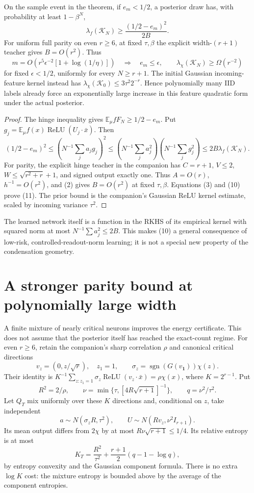 \documentclass[11pt]{article}
\newcommand{\E}{\mathbb E}\newcommand{\R}{\mathbb R}
\newcommand{\relu}{\operatorname{ReLU}}\newcommand{\Prb}{\mathbb P}
\begin{document}
\begin{corollary}
On the sample event in the theorem, if $e_m<1/2$, a posterior draw has,
with probability at least $1-\beta^N$,
\[
 \lambda_f(\mathcal K_N)\ge\frac{(1/2-e_m)^2}{2B}.        \tag{10}
\]
For uniform full parity on even $r\ge6$, at fixed $\tau,\beta$ the
explicit width-$(r+1)$ teacher gives $B=O(r^2)$. Thus
\[
 m=O\!\left(r^5\epsilon^{-2}[1+\log(1/\eta)]\right)
 \quad\Longrightarrow\quad e_m\le\epsilon,
 \qquad \lambda_\chi(\mathcal K_N)\ge\Omega(r^{-2})       \tag{11}
\]
for fixed $\epsilon<1/2$, uniformly for every $N\ge r+1$.
The initial Gaussian incoming-feature kernel instead has
$\lambda_\chi(\mathcal K_0)\le3\tau^2 2^{-r}$.
Hence polynomially many IID labels already force an exponentially large
increase in this feature quadratic form under the actual posterior.
\end{corollary}
\begin{proof}
The hinge inequality gives $\E_\mu fF_N\ge1/2-e_m$.
Put $g_j=\E_\mu f(x)\relu(U_j\cdot\bar x)$. Then
\[
 (1/2-e_m)^2\le\left(N^{-1}\sum_j a_jg_j\right)^2
 \le\left(N^{-1}\sum_j a_j^2\right)
                         \left(N^{-1}\sum_jg_j^2\right)
 \le2B\lambda_f(\mathcal K_N).
\]
For parity, the explicit hinge teacher in the companion has
$C=r+1$, $V\le2$, $W\le\sqrt{r^2+r}+1$, and signed output exactly one.
Thus $A=O(r)$, $h^{-1}=O(r^2)$, and (2) gives $B=O(r^2)$ at fixed
$\tau,\beta$. Equations (3) and (10) prove (11).
The prior bound is the companion's Gaussian ReLU kernel estimate,
scaled by incoming variance $\tau^2$.
\end{proof}
The learned network itself is a function in the RKHS of its empirical
kernel with squared norm at most $N^{-1}\sum a_j^2\le2B$. This makes
(10) a general consequence of low-risk, controlled-readout-norm learning;
it is not a special new property of the condensation geometry.

\section{A stronger parity bound at polynomially large width}
A finite mixture of nearly critical neurons improves the energy certificate.
This does not assume that the posterior itself has reached the exact-count
regime. For even $r\ge6$, retain the companion's sharp correlation $\rho$
and canonical critical directions
\[
 v_z=(0,z/\sqrt r),\quad z_1=1,\qquad
 \sigma_z=\operatorname{sgn}(G(v_{\boldsymbol1}))\chi(z).
\]
Their identity is
$K^{-1}\sum_{z:z_1=1}\sigma_z\relu(v_z\cdot\bar x)=\rho\chi(x)$,
where $K=2^{r-1}$. Put
\[
 R^2=2/\rho,\qquad
 \nu=\min\{\tau,[4R\sqrt{r+1}]^{-1}\},\qquad q=\nu^2/\tau^2.
\]
Let $Q_T$ mix uniformly over these $K$ directions and, conditional on $z$,
take independent
\[
 a\sim N(\sigma_zR,\tau^2),\qquad
 U\sim N(Rv_z,\nu^2I_{r+1}).
\]
Its mean output differs from $2\chi$ by at most
$R\nu\sqrt{r+1}\le1/4$. Its relative entropy is at most
\[
 K_T=\frac{R^2}{\tau^2}
             +\frac{r+1}{2}(q-1-\log q),                 \tag{12}
\]
by entropy convexity and the Gaussian component formula. There is no
extra $\log K$ cost: the mixture entropy is bounded above by the average
of the component entropies.
\end{document}
